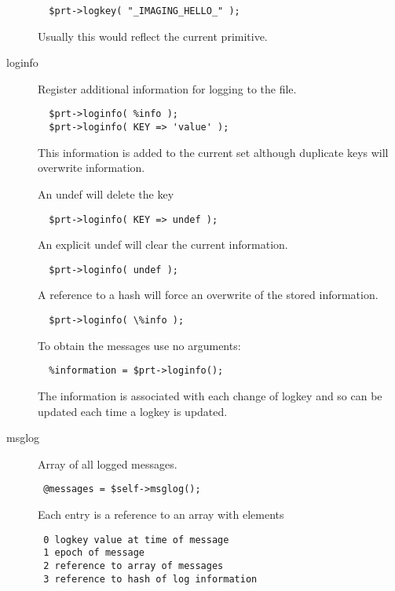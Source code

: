 \begin{description}
\begin{verbatim}
  $prt->logkey( "_IMAGING_HELLO_" );
\end{verbatim}


Usually this would reflect the current primitive.


\item[{loginfo}] \mbox{}

Register additional information for logging to the file.

\begin{verbatim}
  $prt->loginfo( %info );
  $prt->loginfo( KEY => 'value' );
\end{verbatim}


This information is added to the current set although duplicate keys will
overwrite information.



An undef will delete the key

\begin{verbatim}
  $prt->loginfo( KEY => undef );
\end{verbatim}


An explicit undef will clear the current information.

\begin{verbatim}
  $prt->loginfo( undef );
\end{verbatim}


A reference to a hash will force an overwrite of the stored information.

\begin{verbatim}
  $prt->loginfo( \%info );
\end{verbatim}


To obtain the messages use no arguments:

\begin{verbatim}
  %information = $prt->loginfo();
\end{verbatim}


The information is associated with each change of logkey and so can be
updated each time a logkey is updated.


\item[{msglog}] \mbox{}

Array of all logged messages.

\begin{verbatim}
 @messages = $self->msglog();
\end{verbatim}


Each entry is a reference to an array with elements

\begin{verbatim}
 0 logkey value at time of message
 1 epoch of message
 2 reference to array of messages
 3 reference to hash of log information
\end{verbatim}



\end{description}
